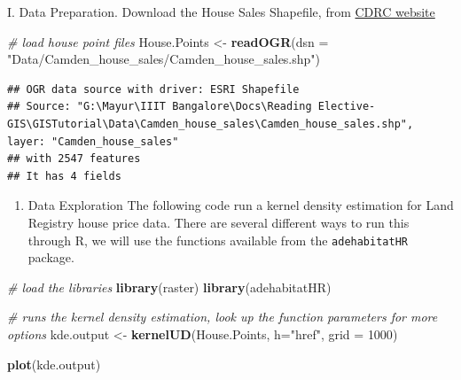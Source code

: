 \documentclass[]{article}
\newenvironment{Shaded}{}{}
\newcommand{\CommentTok}[1]{\textcolor[rgb]{0.38,0.63,0.69}{\textit{#1}}}
\newcommand{\DataTypeTok}[1]{\textcolor[rgb]{0.56,0.13,0.00}{#1}}
\newcommand{\DecValTok}[1]{\textcolor[rgb]{0.25,0.63,0.44}{#1}}
\newcommand{\KeywordTok}[1]{\textcolor[rgb]{0.00,0.44,0.13}{\textbf{#1}}}
\newcommand{\NormalTok}[1]{#1}
\newcommand{\StringTok}[1]{\textcolor[rgb]{0.25,0.44,0.63}{#1}}
\providecommand{\tightlist}{%
  \setlength{\itemsep}{0pt}\setlength{\parskip}{0pt}}
\begin{document}
I. Data Preparation. Download the House Sales Shapefile, from
\href{https://data.cdrc.ac.uk/tutorial/an-introduction-to-spatial-data-analysis-and-visualisation-in-r}{CDRC
website}

\begin{Shaded}
\begin{Highlighting}[]
\CommentTok{# load house point files}
\NormalTok{House.Points <-}\StringTok{ }\KeywordTok{readOGR}\NormalTok{(}\DataTypeTok{dsn =} \StringTok{"Data/Camden_house_sales/Camden_house_sales.shp"}\NormalTok{)}
\end{Highlighting}
\end{Shaded}

\begin{verbatim}
## OGR data source with driver: ESRI Shapefile 
## Source: "G:\Mayur\IIIT Bangalore\Docs\Reading Elective-GIS\GISTutorial\Data\Camden_house_sales\Camden_house_sales.shp", layer: "Camden_house_sales"
## with 2547 features
## It has 4 fields
\end{verbatim}

\begin{enumerate}
\def\labelenumi{\Roman{enumi}.}
\setcounter{enumi}{1}
\tightlist
\item
  Data Exploration The following code run a kernel density estimation
  for Land Registry house price data. There are several different ways
  to run this through R, we will use the functions available from the
  \texttt{adehabitatHR} package.
\end{enumerate}

\begin{Shaded}
\begin{Highlighting}[]
\CommentTok{# load the libraries}
\KeywordTok{library}\NormalTok{(raster)}
\KeywordTok{library}\NormalTok{(adehabitatHR)}

\CommentTok{# runs the kernel density estimation, look up the function parameters for more options}
\NormalTok{kde.output <-}\StringTok{ }\KeywordTok{kernelUD}\NormalTok{(House.Points, }\DataTypeTok{h=}\StringTok{"href"}\NormalTok{, }\DataTypeTok{grid =} \DecValTok{1000}\NormalTok{)}

\KeywordTok{plot}\NormalTok{(kde.output)}
\end{Highlighting}
\end{Shaded}
\end{document}
